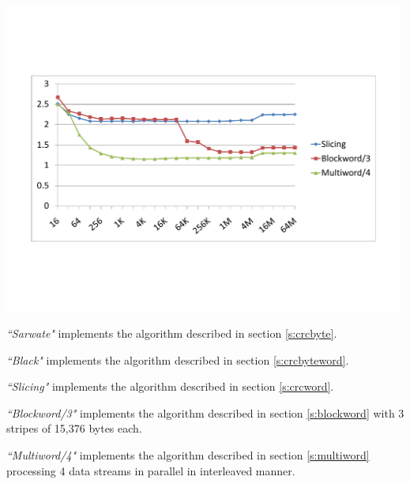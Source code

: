 \documentclass{article}
\begin{document}
\begin{table}
\begin{center}
\includegraphics[trim=14.25mm 50mm 16.75mm 50mm, width=0.99\textwidth]{CRC64-small.pdf} \label{f:CRC64Perf}
\end{center}

{\it``Sarwate"} implements the algorithm described in section
\ref{s:crcbyte}.

{\it``Black"} implements the algorithm described in section
\ref{s:crcbyteword}.

{\it``Slicing"} implements the algorithm described in section
\ref{s:crcword}.

{\it``Blockword/3"} implements the algorithm described in section
\ref{s:blockword} with 3 stripes of 15,376 bytes each.

{\it``Multiword/4"} implements the algorithm described in section
\ref{s:multiword} processing 4 data streams in parallel in interleaved
manner.


\end{table}
\end{document}
